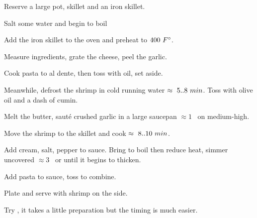 \begin{preparation}
\item Reserve a large pot, skillet and an iron skillet.

\item Salt some water and begin to boil

\item Add the iron skillet to the oven and preheat to $400~\Fahrenheit$.

\item Measure ingredients, grate the cheese, peel the garlic.

\item Cook pasta to al dente, then toss with oil, set aside.

\item Meanwhile, defrost the shrimp in cold running water $\approx~5..8~\minute$.
	Toss with olive oil and a dash of cumin.

\item Melt the butter, saut\'{e} crushed garlic in a large saucepan $\approx1$ \minute~on medium-high.

\item Move the shrimp to the skillet and cook $\approx~8..10~\minute$.

\item Add cream, salt, pepper to sauce. Bring to boil then reduce heat, simmer uncovered $\approx3$ \minute~or until it begins to thicken.

\item Add pasta to sauce, toss to combine.

\item Plate and serve with shrimp on the side.
\end{preparation}

\begin{variation}
\item Try , it takes a little preparation but the timing is much easier.

\end{variation}

\recipeend%
